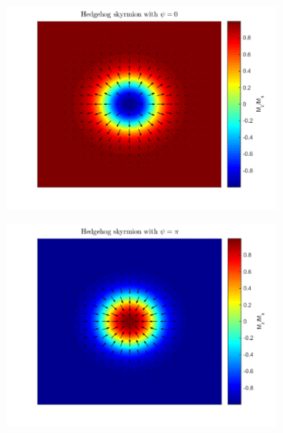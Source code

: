 \begin{figure}[h!]
\centering
\begin{subfigure}{.49\textwidth}
  \centering
  \includegraphics[width=\linewidth]{Figures/HedgehogSkyrmionPsi0.pdf}
  \caption{}
  \label{fig:HedgehogSkyrmion1}
\end{subfigure}
\begin{subfigure}{.49\textwidth}
  \centering
  \includegraphics[width=\linewidth]{Figures/HedgehogSkyrmionPsiPi.pdf}
  \caption{}
  \label{fig:HedgehogSkyrmion2}
\end{subfigure}
\newline
\begin{subfigure}{.49\textwidth}
  \centering

\end{subfigure}
\end{figure}
